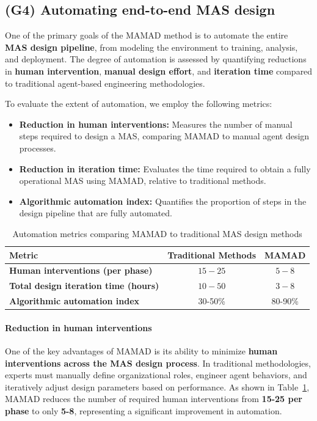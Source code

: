 \documentclass[pdflatex,sn-mathphys-num]{sn-jnl}%
\theoremstyle{thmstyleone}%
\theoremstyle{thmstyletwo}%
\theoremstyle{thmstylethree}%
\begin{document}
\subsection{(G4) Automating end-to-end MAS design}

One of the primary goals of the MAMAD method is to automate the entire \textbf{MAS design pipeline}, from modeling the environment to training, analysis, and deployment. The degree of automation is assessed by quantifying reductions in \textbf{human intervention}, \textbf{manual design effort}, and \textbf{iteration time} compared to traditional agent-based engineering methodologies.

To evaluate the extent of automation, we employ the following metrics:

\begin{itemize}
    \item \textbf{Reduction in human interventions:} Measures the number of manual steps required to design a MAS, comparing MAMAD to manual agent design processes.
    \item \textbf{Reduction in iteration time:} Evaluates the time required to obtain a fully operational MAS using MAMAD, relative to traditional methods.
    \item \textbf{Algorithmic automation index:} Quantifies the proportion of steps in the design pipeline that are fully automated.
\end{itemize}

\begin{table}[h!]
    \centering
    \caption{Automation metrics comparing MAMAD to traditional MAS design methods}
    \begin{tabular}{|l|c|c|}
        \hline
        \textbf{Metric} & \textbf{Traditional Methods} & \textbf{MAMAD} \\
        \hline
        \textbf{Human interventions (per phase)} & $15 - 25$ & $5 - 8$ \\
        \hline
        \textbf{Total design iteration time (hours)} & $10 - 50$ & $3 - 8$ \\
        \hline
        \textbf{Algorithmic automation index} & 30-50\% & 80-90\% \\
        \hline
    \end{tabular}
    \label{tab:automation}
\end{table}

\paragraph{Reduction in human interventions}
One of the key advantages of MAMAD is its ability to minimize \textbf{human interventions across the MAS design process}. In traditional methodologies, experts must manually define organizational roles, engineer agent behaviors, and iteratively adjust design parameters based on performance. As shown in Table~\ref{tab:automation}, MAMAD reduces the number of required human interventions from \textbf{15-25 per phase} to only \textbf{5-8}, representing a significant improvement in automation.
\end{document}

